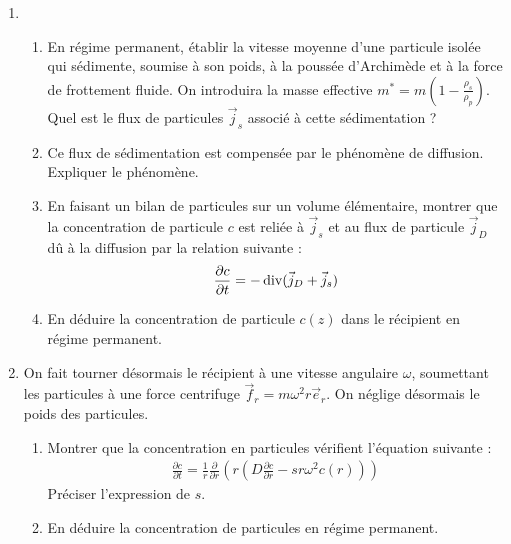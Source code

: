 \begin{enumerate}

\item

\begin{enumerate}

\item En régime permanent, établir la vitesse moyenne d'une particule isolée qui sédimente, soumise à son poids, à la poussée d'Archimède et à la force de frottement fluide.	On introduira la masse effective $m^*=m\left( 1-\frac{\rho_s}{\rho_p}\right) $. Quel est le flux de particules $\vec{j}_s$ associé à cette sédimentation ? 
	
	\item Ce flux de sédimentation est compensée par le phénomène de diffusion. Expliquer le phénomène. 
	
	\item En faisant un bilan de particules sur un volume élémentaire, montrer que la concentration de particule $c$ est reliée à $\vec{j}_s$ et au flux de particule $\vec{j}_D$ dû à la diffusion par la relation suivante :
	\begin{align*}
		\frac{\partial c}{\partial t}=-\mathop{}\!\mathrm{div}(\vec{j}_D+\vec{j}_s)
	\end{align*}
	
	\item En déduire la concentration de particule $c(z)$ dans le récipient en régime permanent.

\end{enumerate}

\item On fait tourner désormais le récipient à une vitesse angulaire $\omega$, soumettant les particules à une force centrifuge $\vec{f}_r=m\omega^2r\vec{e}_r$. On néglige désormais le poids des particules.

\begin{enumerate}

	\item Montrer que la concentration en particules vérifient l'équation suivante :
	\begin{align*}
		\frac{\partial c}{\partial t}=\frac{1}{r}\frac{\partial }{\partial r}\left(r\left(D\frac{\partial c}{\partial r} -sr\omega^2c(r) \right) \right)
	\end{align*}
	Préciser l'expression de $s$.
	
	\item En déduire la concentration de particules en régime permanent. 

\end{enumerate}

\end{enumerate}

